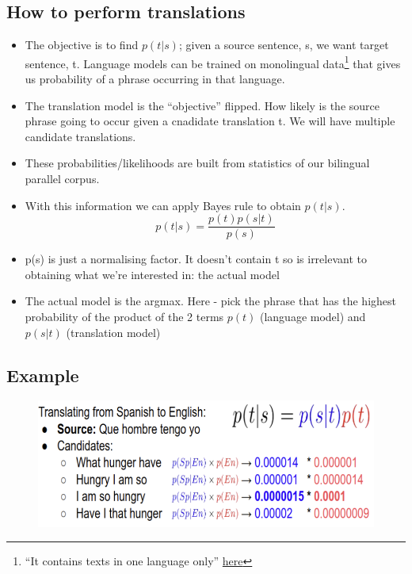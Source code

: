 \documentclass[11pt]{article}
\begin{document}
\subsection{How to perform translations}

\begin{itemize}
    \item The objective is to find $p(t|s)$; given a source sentence, s, we want target sentence, t. Language models can be trained on monolingual data\footnote{``It contains texts in one language only'' \href{https://www.sketchengine.eu/corpora-and-languages/corpus-types/}{here}} that gives us probability of a phrase occurring in that language.
    \item The translation model is the ``objective'' flipped. How likely is the source phrase going to occur given a cnadidate translation t. We will have multiple candidate translations. 
    \item These probabilities/likelihoods are built from statistics of our bilingual parallel corpus.
    \item With this information we can apply Bayes rule to obtain $p(t|s)$.
    \begin{equation*}
        p(t|s) = \frac{p(t)p(s|t)}{p(s)}
    \end{equation*}
    \item p(s) is just a normalising factor. It doesn't contain t so is irrelevant to     obtaining what we're interested in: the actual model
    \item The actual model is the argmax. Here - pick the phrase that has the highest
    probability of the product of the 2 terms $p(t)$ (language model) and $p(s|t)$
    (translation model)
\end{itemize}

\subsection{Example}

\begin{figure}[H]
    \centering
    \includegraphics*[width=.9\linewidth]{figures/example-translation-1.png}
\end{figure}
\end{document}
